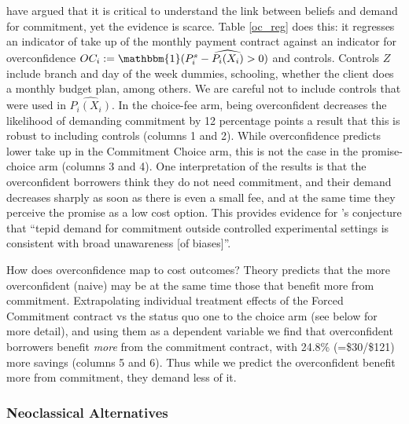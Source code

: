 \documentclass[oneside,11pt]{article}
\begin{document}
\cite{Sprenger} have argued that it is critical to understand the link between beliefs and demand for commitment, yet the evidence is scarce. Table \ref{oc_reg} does this: it regresses an indicator of take up of the monthly payment contract against an indicator for overconfidence $OC_i:=\mathbbm{1}(P^s_i-\widehat{P_i(X_i)}>0)$ and controls. Controls $Z$ include branch and day of the week dummies, schooling, whether the client does a monthly budget plan, among others. We are careful not to include controls that were used in $\widehat{P_i(X_i)}$. %
In the choice-fee arm, being overconfident decreases the likelihood of demanding commitment by 12 percentage points a result that this is robust to including controls  (columns 1 and 2). While overconfidence predicts lower take up in the Commitment Choice arm, this is not the case in the promise-choice arm (columns 3 and 4).  One interpretation of the results is that the overconfident borrowers think they do not need commitment, and their demand decreases sharply as soon as there is even a small fee, and at the same time they perceive the promise as a low cost option. This provides evidence for \cite{Sprenger}'s conjecture that ``tepid demand for commitment outside controlled experimental settings is consistent with broad unawareness [of biases]''. 

How does overconfidence map to cost outcomes? Theory predicts that the more overconfident (naive) may be at the same time those that benefit more from commitment. Extrapolating individual treatment effects of the Forced Commitment contract vs the status quo one to the choice arm (see below for more detail), and using them as a dependent variable we find that overconfident borrowers benefit \textit{more} from the commitment contract, with {24.8}\% (=\${30}/\${121}) more savings (columns 5 and 6). Thus while we predict the overconfident benefit more from commitment, they demand less of it. 







\subsubsection{Neoclassical Alternatives} \label{neoclasical}
\end{document}
